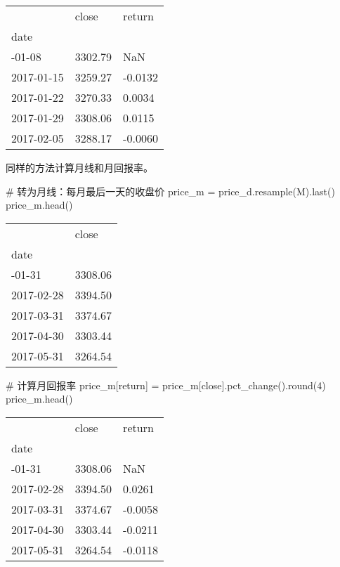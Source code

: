 \documentclass[
  letterpaper,
  DIV=11,
  numbers=noendperiod]{scrreprt}
\newenvironment{Shaded}{\begin{snugshade}}{\end{snugshade}}
\newcommand{\BuiltInTok}[1]{\textcolor[rgb]{0.00,0.23,0.31}{#1}}
\newcommand{\CommentTok}[1]{\textcolor[rgb]{0.37,0.37,0.37}{#1}}
\newcommand{\DecValTok}[1]{\textcolor[rgb]{0.68,0.00,0.00}{#1}}
\newcommand{\NormalTok}[1]{\textcolor[rgb]{0.00,0.23,0.31}{#1}}
\newcommand{\OperatorTok}[1]{\textcolor[rgb]{0.37,0.37,0.37}{#1}}
\newcommand{\StringTok}[1]{\textcolor[rgb]{0.13,0.47,0.30}{#1}}
\begin{document}
\begin{longtable}[]{@{}lll@{}}
\toprule\noalign{}
& close & return \\
date & & \\
\midrule\noalign{}
\endhead
\bottomrule\noalign{}
\endlastfoot
2017-01-08 & 3302.79 & NaN \\
2017-01-15 & 3259.27 & -0.0132 \\
2017-01-22 & 3270.33 & 0.0034 \\
2017-01-29 & 3308.06 & 0.0115 \\
2017-02-05 & 3288.17 & -0.0060 \\
\end{longtable}

同样的方法计算月线和月回报率。

\begin{Shaded}
\begin{Highlighting}[]
\CommentTok{\# 转为月线：每月最后一天的收盘价}
\NormalTok{price\_m }\OperatorTok{=}\NormalTok{ price\_d.resample(}\StringTok{\textquotesingle{}M\textquotesingle{}}\NormalTok{).last()}
\NormalTok{price\_m.head()}
\end{Highlighting}
\end{Shaded}

\begin{longtable}[]{@{}ll@{}}
\toprule\noalign{}
& close \\
date & \\
\midrule\noalign{}
\endhead
\bottomrule\noalign{}
\endlastfoot
2017-01-31 & 3308.06 \\
2017-02-28 & 3394.50 \\
2017-03-31 & 3374.67 \\
2017-04-30 & 3303.44 \\
2017-05-31 & 3264.54 \\
\end{longtable}

\begin{Shaded}
\begin{Highlighting}[]
\CommentTok{\# 计算月回报率}
\NormalTok{price\_m[}\StringTok{\textquotesingle{}return\textquotesingle{}}\NormalTok{] }\OperatorTok{=}\NormalTok{ price\_m[}\StringTok{\textquotesingle{}close\textquotesingle{}}\NormalTok{].pct\_change().}\BuiltInTok{round}\NormalTok{(}\DecValTok{4}\NormalTok{)}
\NormalTok{price\_m.head()}
\end{Highlighting}
\end{Shaded}

\begin{longtable}[]{@{}lll@{}}
\toprule\noalign{}
& close & return \\
date & & \\
\midrule\noalign{}
\endhead
\bottomrule\noalign{}
\endlastfoot
2017-01-31 & 3308.06 & NaN \\
2017-02-28 & 3394.50 & 0.0261 \\
2017-03-31 & 3374.67 & -0.0058 \\
2017-04-30 & 3303.44 & -0.0211 \\
2017-05-31 & 3264.54 & -0.0118 \\
\end{longtable}
\end{document}
